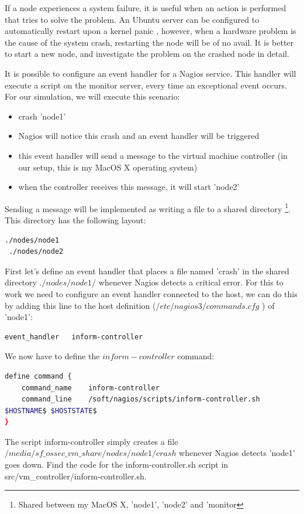 \documentclass[12pt]{report}
\begin{document}
If a node experiences a system failure, it is useful when an action is
performed that tries to solve the problem. An Ubuntu server can be
configured to automatically restart upon a kernel panic
\cite{restart_upon_kernel_panic}, however, when a hardware problem is
the cause of the system crash, restarting the node will be of no
avail. It is better to start a new node, and investigate the problem
on the crashed node in detail.

It is possible to configure an event handler for a Nagios
service. This handler will execute a script on the monitor
server, every time an exceptional event occurs.
For our simulation, we will execute this scenario:
\begin{itemize}
\item crash 'node1'
\item Nagios will notice this crash and an event handler will be
  triggered
\item this event handler will send a message to the virtual machine
  controller (in our setup, this is my MacOS X operating
  system)
\item when the controller receives this message, it will start 'node2'
\end{itemize}
Sending a message will be implemented as writing a file to a shared
directory \footnote{Shared between my MacOS X, 'node1', 'node2' and 'monitor}. This directory has the following layout:
\begin{lstlisting}[language=bash]
 ./nodes/node1
 ./nodes/node2
\end{lstlisting} 
First let's define an event handler that places a file named 'crash' in the
shared directory $./nodes/node1/$ whenever Nagios detects a critical
error.
For this to work we need to configure an event handler connected to
the host, we can do this by adding this line to the host definition ($/etc/nagios3/commands.cfg$ ) of 'node1':
\begin{lstlisting}[language=bash]
event_handler   inform-controller
\end{lstlisting} 
We now have to define the $inform-controller$ command:
\begin{lstlisting}[language=bash]
define command {
    command_name    inform-controller
    command_line    /soft/nagios/scripts/inform-controller.sh
$HOSTNAME$ $HOSTSTATE$
}
\end{lstlisting} 
The script inform-controller simply creates a file
$/media/sf\_ossec\_vm\_share/nodes/node1/crash$ whenever Nagios
detects 'node1' goes down.
Find the code for the inform-controller.sh script in src/vm\_controller/inform-controller.sh.
\end{document}
